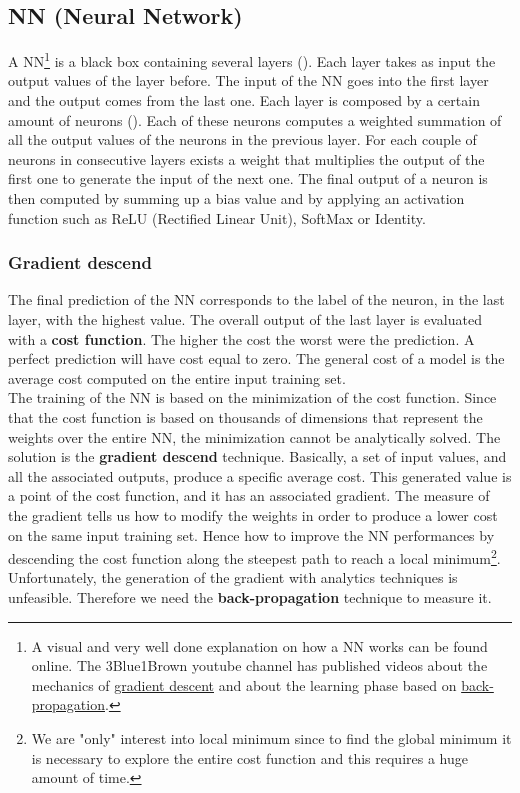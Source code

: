 \subsection{NN (Neural Network)} \label{sec:nn}
A NN\footnote{A visual and very well done explanation on how a NN works can be found online. The 3Blue1Brown youtube channel has published videos about the mechanics of \href{https://www.youtube.com/watch?v=IHZwWFHWa-w}{gradient descent} and about the learning phase based on \href{https://www.youtube.com/watch?v=Ilg3gGewQ5U}{back-propagation}.} is a black box containing several layers (). Each layer takes as input the output values of the layer before. The input of the NN goes into the first layer and the output comes from the last one. Each layer is composed by a certain amount of neurons (). Each of these neurons computes a weighted summation of all the output values of the neurons in the previous layer. For each couple of neurons in consecutive layers exists a weight that multiplies the output of the first one to generate the input of the next one. The final output of a neuron is then computed by summing up a bias value and by applying an activation function such as ReLU (Rectified Linear Unit), SoftMax or Identity.

\subsubsection*{Gradient descend}
The final prediction of the NN corresponds to the label of the neuron, in the last layer, with the highest value. The overall output of the last layer is evaluated with a \textbf{cost function}. The higher the cost the worst were the prediction. A perfect prediction will have cost equal to zero. The general cost of a model is the average cost computed on the entire input training set.\\
The training of the NN is based on the minimization of the cost function. Since that the cost function is based on thousands of dimensions that represent the weights over the entire NN, the minimization cannot be analytically solved. The solution is the \textbf{gradient descend} technique. Basically, a set of input values, and all the associated outputs, produce a specific average cost. This generated value is a point of the cost function, and it has an associated gradient. The measure of the gradient tells us how to modify the weights in order to produce a lower cost on the same input training set. Hence how to improve the NN performances by descending the cost function along the steepest path to reach a local minimum\footnote{We are "only" interest into local minimum since to find the global minimum it is necessary to explore the entire cost function and this requires a huge amount of time.}.\\
Unfortunately, the generation of the gradient with analytics techniques is unfeasible. Therefore we need the \textbf{back-propagation} technique to measure it.

